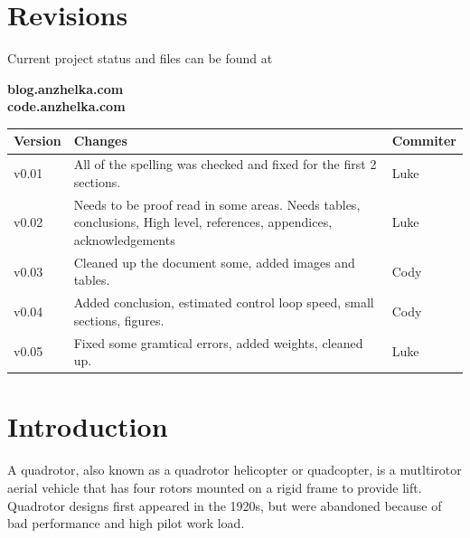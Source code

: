 \documentclass{article}
\numberwithin{equation}{section} %
\begin{document}
\section*{Revisions}
Current project status and files can be found at
\begin{center}
\bigskip \textbf{blog.anzhelka.com} \\
 \textbf{code.anzhelka.com} \\
 \bigskip
\end{center}

\begin{longtable}{l | p{5cm} | l}
\hline
\textbf{Version} & \textbf{Changes} & \textbf{Commiter}\\
\hline
v0.01 & All of the spelling was checked and fixed for the first 2 sections. & Luke \\
\hline
v0.02 & Needs to be proof read in some areas. Needs tables, conclusions, High level, references, appendices, acknowledgements & Luke \\
\hline
v0.03 & Cleaned up the document some, added images and tables. & Cody \\
\hline
v0.04 & Added conclusion, estimated control loop speed, small sections, figures. & Cody \\
\hline
v0.05 & Fixed some gramtical errors, added weights, cleaned up. & Luke \\
\hline
\end{longtable}


\newpage
\renewcommand{\contentsname}{Table of Contents}
\tableofcontents
{}
\newpage



\section{Introduction}

A quadrotor, also known as a quadrotor helicopter or quadcopter, is a mutltirotor aerial vehicle that has four rotors mounted on a rigid frame to provide lift. Quadrotor designs first appeared in the 1920s, but were abandoned because of bad performance and high pilot work load.
\end{document}
